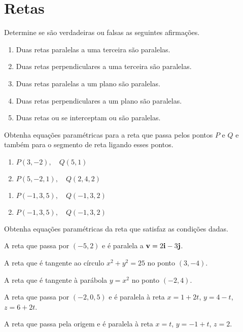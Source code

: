 \section{Retas}

\item Determine se são verdadeiras ou falsas as seguintes afirmações.
\begin{enumerate}[leftmargin=*]
\item  Duas retas paralelas a uma terceira são paralelas.
\item  Duas retas perpendiculares a uma terceira são paralelas.
\item  Duas retas paralelas a um plano são paralelas.
\item  Duas retas perpendiculares a um plano são paralelas.
\item  Duas retas ou se interceptam ou são paralelas.
\end{enumerate}

\item[\textcolor{blue}{44-45}] Obtenha equações paramétricas para a reta que passa pelos pontos
$P$ e $Q$ e também para o segmento de reta ligando esses pontos.
\item 
\begin{enumerate}[leftmargin=*]
    \item $P(3, -2),\quad Q(5, 1)$
    \item $P(5, -2, 1),\quad Q(2, 4, 2)$
\end{enumerate}
\item 
\begin{enumerate}[leftmargin=*]
    \item $P (-1, 3, 5), \quad Q(-1, 3, 2)$
    \item $P (-1, 3, 5),\quad Q(-1, 3, 2)$
\end{enumerate}
\item[\textcolor{blue}{46-50}] Obtenha equações paramétricas da reta que satisfaz as condições dadas.

\item A reta que passa por $(-5, 2)$ e é paralela a $\mathbf{v}=2\mathbf{i} - 3\mathbf{j}$.
\item A reta que é tangente ao círculo $x^2 + y^2 = 25$ no ponto $(3,-4)$.
\item A reta que é tangente à parábola $y = x^2$ no ponto $(-2, 4)$.

\item A reta que passa por $(-2, 0, 5)$ e é paralela à reta $x = 1 + 2t$, $y = 4 - t$, $z = 6 + 2t$.
\item A reta que passa pela origem e é paralela à reta $x = t$, $y = -1+ t$, $z = 2$.

